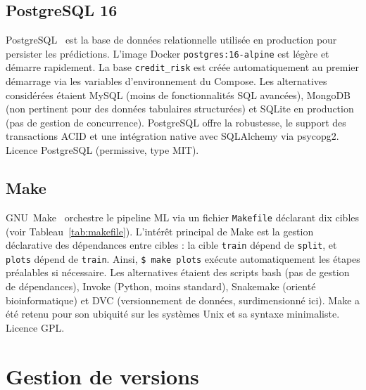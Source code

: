\documentclass[12pt,a4paper,openany]{report}
\newcommand{\file}[1]{\texttt{#1}}
\newcommand{\cmd}[1]{\texttt{\$ #1}}
\begin{document}
\subsection{PostgreSQL 16}

PostgreSQL~\cite{postgresql} est la base de données relationnelle utilisée en production pour persister les prédictions. L'image Docker \texttt{postgres:16-alpine} est légère et démarre rapidement. La base \texttt{credit\_risk} est créée automatiquement au premier démarrage via les variables d'environnement du Compose. Les alternatives considérées étaient MySQL (moins de fonctionnalités SQL avancées), MongoDB (non pertinent pour des données tabulaires structurées) et SQLite en production (pas de gestion de concurrence). PostgreSQL offre la robustesse, le support des transactions ACID et une intégration native avec SQLAlchemy via psycopg2. Licence PostgreSQL (permissive, type MIT).

\subsection{Make}

GNU~Make~\cite{gnumake} orchestre le pipeline ML via un fichier \file{Makefile} déclarant dix cibles (voir Tableau~\ref{tab:makefile}). L'intérêt principal de Make est la gestion déclarative des dépendances entre cibles : la cible \texttt{train} dépend de \texttt{split}, et \texttt{plots} dépend de \texttt{train}. Ainsi, \cmd{make plots} exécute automatiquement les étapes préalables si nécessaire. Les alternatives étaient des scripts bash (pas de gestion de dépendances), Invoke (Python, moins standard), Snakemake (orienté bioinformatique) et DVC (versionnement de données, surdimensionné ici). Make a été retenu pour son ubiquité sur les systèmes Unix et sa syntaxe minimaliste. Licence GPL.

\section{Gestion de versions}
\end{document}
